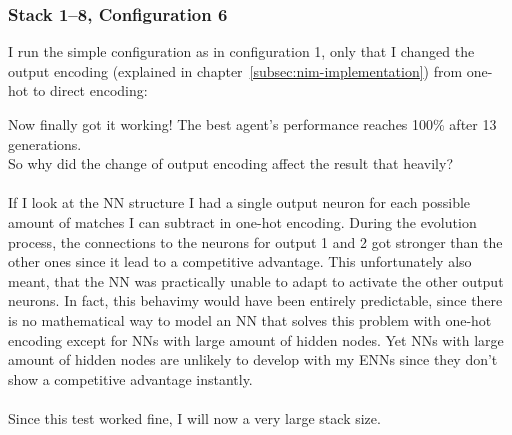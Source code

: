 \documentclass[11pt]{report}
\begin{document}
\begin{enumerate}
    \subsubsection{Stack 1--8, Configuration 6}
    I run the simple configuration as in configuration 1, only that I changed the output encoding (explained in chapter~\ref{subsec:nim-implementation}) from one-hot to direct encoding:
    \\
    \renewcommand{\csvpath}{../data/simple_nim/stack_8r/t_6/stats.csv} %
    \begin{center}
    \end{center}
    Now finally got it working!
    The best agent's performance reaches 100\% after 13 generations.
    \\
    So why did the change of output encoding affect the result that heavily?
    \\ \\
    If I look at the NN structure I had a single output neuron for each possible amount of matches I can subtract in one-hot encoding.
    During the evolution process, the connections to the neurons for output 1 and 2 got stronger than the other ones since it lead to a competitive advantage.
    This unfortunately also meant, that the NN was practically unable to adapt to activate the other output neurons.
    In fact, this behavimy would have been entirely predictable, since there is no mathematical way to model an NN that solves this problem with one-hot encoding except for NNs with large amount of hidden nodes.
    Yet NNs with large amount of hidden nodes are unlikely to develop with my ENNs since they don't show a competitive advantage instantly.
    \\\\
    Since this test worked fine, I will now a very large stack size.


\end{enumerate}
\end{document}
